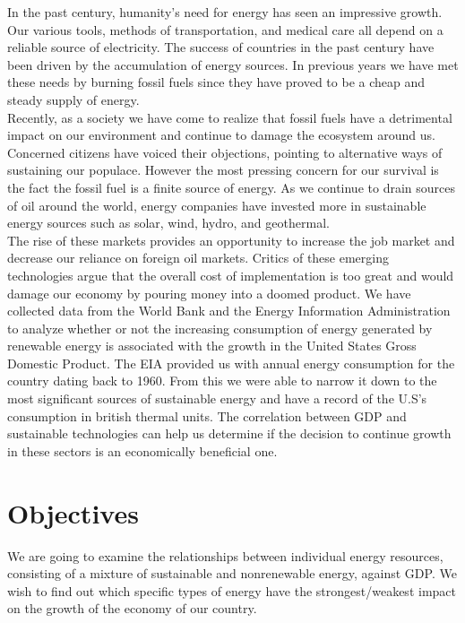 \documentclass[14pt, titlepage]{article}
\begin{document}
		In the past century, humanity’s need for energy has seen an impressive growth. Our various tools, methods of transportation, and medical care all depend on a reliable source of electricity. The success of countries in the past century have been driven by the accumulation of energy sources. In previous years we have met these needs by burning fossil fuels since they have proved to be a cheap and steady supply of energy.\\ Recently, as a society we have come to realize that fossil fuels have a detrimental impact on our environment and continue to damage the ecosystem around us. Concerned citizens have voiced their objections, pointing to alternative ways of sustaining our populace. However the most pressing concern for our survival is the fact the fossil fuel is a finite source of energy. As we continue to drain sources of oil around the world, energy companies have invested more in sustainable energy sources such as solar, wind, hydro, and geothermal. \\ The rise of these markets provides an opportunity to increase the job market and decrease our reliance on foreign oil markets.  Critics of these emerging technologies argue that the overall cost of implementation is too great and would damage our economy by pouring money into a doomed product. We have collected data from the World Bank and the Energy Information Administration to analyze whether or not the increasing consumption of energy generated by renewable energy is associated with the growth in the United States Gross Domestic Product. The EIA provided us with annual energy consumption for the country dating back to 1960. From this we were able to narrow it down to the most significant sources of sustainable energy and have a record of the U.S's consumption in british thermal units. The correlation between GDP and sustainable technologies can help us determine if the decision to continue growth in these sectors is an economically beneficial one.
  


	
	\section*{Objectives}
		
			We are going to examine the relationships between individual energy resources, consisting of a mixture of sustainable and nonrenewable energy, against GDP. We wish to find out which specific types of energy have the strongest/weakest impact on the growth of the economy of our country.  
			
\end{document}
